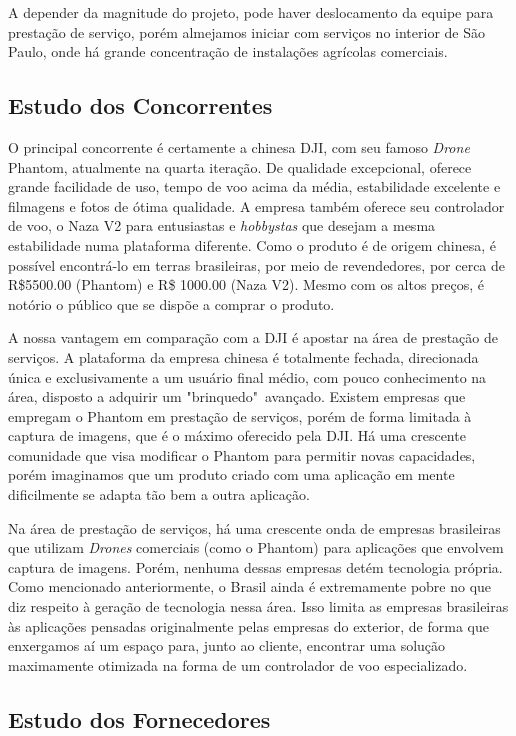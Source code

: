 A depender da magnitude do projeto, pode haver deslocamento da equipe para prestação de serviço, porém almejamos iniciar com serviços no interior de São Paulo, onde há grande concentração de instalações agrícolas comerciais.

\subsection{Estudo dos Concorrentes}

O principal concorrente é certamente a chinesa DJI, com seu famoso \emph{Drone} Phantom, atualmente na quarta iteração. De qualidade excepcional, oferece grande facilidade de uso, tempo de voo acima da média, estabilidade excelente e filmagens e fotos de ótima qualidade. A empresa também oferece seu controlador de voo, o Naza V2 para entusiastas e \emph{hobbystas} que desejam a mesma estabilidade numa plataforma diferente. Como o produto é de origem chinesa, é possível encontrá-lo em terras brasileiras, por meio de revendedores, por cerca de R\$5500.00 (Phantom) e R\$ 1000.00 (Naza V2). Mesmo com os altos preços, é notório o público que se dispõe a comprar o produto.

A nossa vantagem em comparação com a DJI é apostar na área de prestação de serviços. A plataforma da empresa chinesa é totalmente fechada, direcionada única e exclusivamente a um usuário final médio, com pouco conhecimento na área, disposto a adquirir um "brinquedo"\ avançado. Existem empresas que empregam o Phantom em prestação de serviços, porém de forma limitada à captura de imagens, que é o máximo oferecido pela DJI. Há uma crescente comunidade que visa modificar o Phantom para permitir novas capacidades, porém imaginamos que um produto criado com uma aplicação em mente dificilmente se adapta tão bem a outra aplicação.

Na área de prestação de serviços, há uma crescente onda de empresas brasileiras que utilizam \emph{Drones} comerciais (como o Phantom) para aplicações que envolvem captura de imagens. Porém, nenhuma dessas empresas detém tecnologia própria. Como mencionado anteriormente, o Brasil ainda é extremamente pobre no que diz respeito à geração de tecnologia nessa área. Isso limita as empresas brasileiras às aplicações pensadas originalmente pelas empresas do exterior, de forma que enxergamos aí um espaço para, junto ao cliente, encontrar uma solução maximamente otimizada na forma de um controlador de voo especializado. 

\subsection{Estudo dos Fornecedores}

